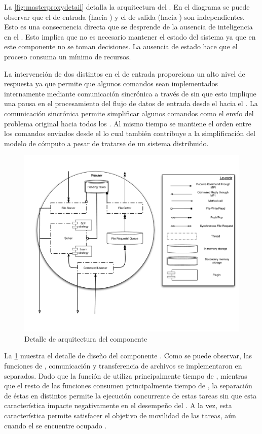 La \fig\ref{fig:masterproxydetail} detalla la arquitectura del \master. En el
diagrama se puede observar que el \datapath de entrada (\fend hacia \bend) y
el de salida (\bend hacia \fend) son independientes. Esto es una consecuencia
directa que se desprende de la ausencia de inteligencia en el \master. Esto
implica que no es necesario mantener el estado del sistema ya que en este
componente no se toman decisiones. La ausencia de estado hace que el proceso
\master consuma un mínimo de recursos.

La intervención de dos \threads distintos en el \datapath de entrada
proporciona un alto nivel de respuesta ya que permite que algunos comandos
sean implementados internamente mediante comunicación sincrónica a través de
\mpi sin que esto implique una pausa en el procesamiento del flujo de datos de
entrada desde el \fend hacia el \bend. La comunicación sincrónica permite
simplificar algunos comandos como el envío del problema original hacia todos
los \ws. Al mismo tiempo se mantiene el orden entre los comandos enviados
desde el \fend lo cual también contribuye a la simplificación del modelo de
cómputo a pesar de tratarse de un sistema distribuido.

\begin{figure}[h!]
\centering
\includegraphics[scale=0.4]{graphs/worker detail}
\caption{Detalle de arquitectura del componente \w}
\label{fig:workerdetail}
\end{figure}

La \fig\ref{fig:workerdetail} muestra el detalle de diseño del componente
\w. Como se puede observar, las funciones de \solving, comunicación y
transferencia de archivos se implementaron en \threads separados. Dado que la
función de \solving utiliza principalmente tiempo de \cpu, mientras que el
resto de las funciones consumen principalmente tiempo de \io, la separación de
éstas en distintos \threads permite la ejecución concurrente de estas
tareas sin que esta característica impacte negativamente en el desempeño del
\ssolver. A la vez, esta característica permite satisfacer el objetivo de
movilidad de las tareas, aún cuando el \w se encuentre ocupado \solveando.

